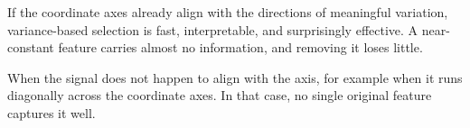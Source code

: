 If the coordinate axes already align with the directions of meaningful variation, variance-based selection is fast, interpretable, and surprisingly effective.
A near-constant feature carries almost no information, and removing it loses little.

\begin{marginfigure}
\centering
{}
\caption{Data spread along $x^{(1)}$ but nearly constant in $x^{(2)}$. Dropping $x^{(2)}$ loses almost nothing.}
\label{fig:naive_aligned}
\end{marginfigure}

When the signal does not happen to align with the axis, for example when it 
runs diagonally across the coordinate axes. In that case, no single original 
feature captures it well.

